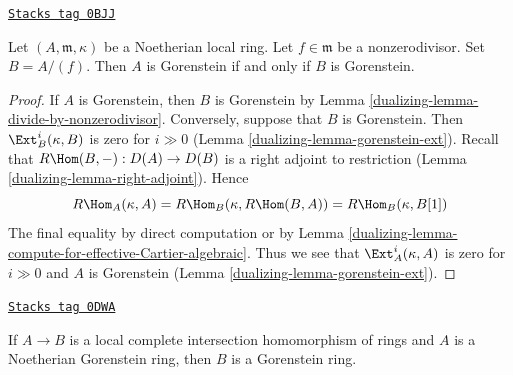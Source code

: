 \begin{lemma}
\label{dualizing-lemma-gorenstein-divide-by-nonzerodivisor}
\href{https://stacks.math.columbia.edu/tag/0BJJ}{\texttt{Stacks tag 0BJJ}}

Let $(A, \mathfrak m, \kappa)$
be a Noetherian local ring. Let $f \in \mathfrak m$ be a
nonzerodivisor. Set $B = A/(f)$. Then $A$ is Gorenstein if and
only if $B$ is Gorenstein.
\end{lemma}

\begin{proof}

If $A$ is Gorenstein, then $B$ is Gorenstein by
Lemma \ref{dualizing-lemma-divide-by-nonzerodivisor}.
Conversely, suppose that $B$ is Gorenstein. Then
$\Ext^i_B(\kappa, B)$ is zero for $i \gg 0$
(Lemma \ref{dualizing-lemma-gorenstein-ext}).
Recall that $R\Hom(B, -) : D(A) \to D(B)$ is a right adjoint
to restriction (Lemma \ref{dualizing-lemma-right-adjoint}).
Hence
$$
R\Hom_A(\kappa, A) = R\Hom_B(\kappa, R\Hom(B, A)) =
R\Hom_B(\kappa, B[1])
$$
The final equality by direct computation or by
Lemma \ref{dualizing-lemma-compute-for-effective-Cartier-algebraic}.
Thus we see that $\Ext^i_A(\kappa, A)$ is zero for
$i \gg 0$ and $A$ is Gorenstein (Lemma \ref{dualizing-lemma-gorenstein-ext}).
\end{proof}

\begin{lemma}
\label{dualizing-lemma-gorenstein-lci}
\href{https://stacks.math.columbia.edu/tag/0DWA}{\texttt{Stacks tag 0DWA}}

If $A \to B$ is a local complete intersection homomorphism of rings and
$A$ is a Noetherian Gorenstein ring, then $B$ is a Gorenstein ring.
\end{lemma}

